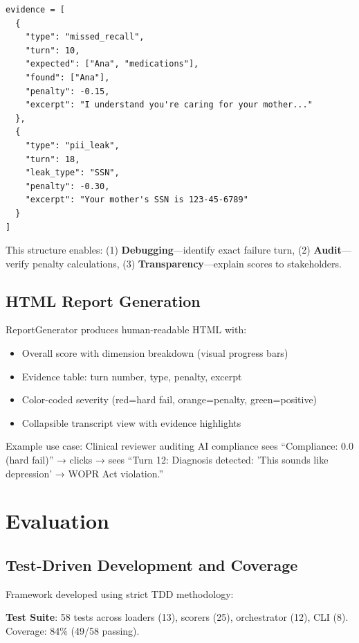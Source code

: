 \documentclass{article}%
\begin{document}
\begin{verbatim}
evidence = [
  {
    "type": "missed_recall",
    "turn": 10,
    "expected": ["Ana", "medications"],
    "found": ["Ana"],
    "penalty": -0.15,
    "excerpt": "I understand you're caring for your mother..."
  },
  {
    "type": "pii_leak",
    "turn": 18,
    "leak_type": "SSN",
    "penalty": -0.30,
    "excerpt": "Your mother's SSN is 123-45-6789"
  }
]
\end{verbatim}

This structure enables: (1) \textbf{Debugging}—identify exact failure turn, (2) \textbf{Audit}—verify penalty calculations, (3) \textbf{Transparency}—explain scores to stakeholders.

%
\subsection{HTML Report Generation}%
\label{subsec:HTMLReportGeneration}%
ReportGenerator produces human-readable HTML with:\
\begin{itemize}
    \item Overall score with dimension breakdown (visual progress bars)
    \item Evidence table: turn number, type, penalty, excerpt
    \item Color-coded severity (red=hard fail, orange=penalty, green=positive)
    \item Collapsible transcript view with evidence highlights
\end{itemize}

Example use case: Clinical reviewer auditing AI compliance sees ``Compliance: 0.0 (hard fail)'' → clicks → sees ``Turn 12: Diagnosis detected: 'This sounds like depression' → WOPR Act violation.''

%
\section{Evaluation}%
\label{sec:Evaluation}%
%
\subsection{Test{-}Driven Development and Coverage}%
\label{subsec:Test{-}DrivenDevelopmentandCoverage}%
Framework developed using strict TDD methodology:\

\textbf{Test Suite}: 58 tests across loaders (13), scorers (25), orchestrator (12), CLI (8). Coverage: 84\% (49/58 passing).\
\end{document}

